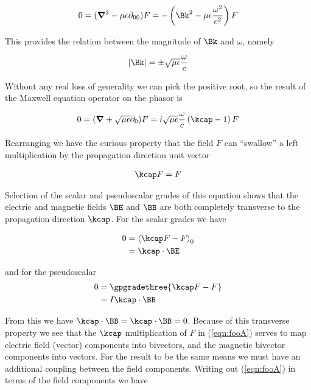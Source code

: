 \begin{align}\label{eqn:foo7}
0 = (\spacegrad^2 - {\mu\epsilon}\partial_{00}) F = -\left( \Bk^2 - {\mu\epsilon}\frac{\omega^2}{c^2} \right) F 
\end{align}

This provides the relation between the magnitude of $\Bk$ and $\omega$, namely

\begin{align}\label{eqn:foo8}
\Abs{\Bk} = \pm \sqrt{\mu\epsilon}\frac{\omega}{c} 
\end{align}

Without any real loss of generality we can pick the positive root, so the result of the Maxwell equation operator on the phasor is

\begin{align}\label{eqn:foo5}
0 = (\spacegrad + \sqrt{\mu\epsilon}\partial_0) F = i \sqrt{\mu\epsilon}\frac{\omega}{c} \left( \kcap - 1\right) F 
\end{align}

Rearranging we have the curious property that the field $F$ can ``swallow'' a left multiplication by the propagation direction unit vector 

\begin{align}\label{eqn:fooA}
\kcap F = F 
\end{align}

Selection of the scalar and pseudoscalar grades of this equation shows that the electric and magnetic fields $\BE$ and $\BB$ are both completely transverse to the propagation direction $\kcap$.  For the scalar grades we have

\begin{align*}
0 &= \gpgradezero{\kcap F - F} \\
  &= \kcap \cdot \BE
\end{align*}

and for the pseudoscalar
\begin{align*}
0 &= \gpgradethree{\kcap F - F} \\
  &= I \kcap \cdot \BB
\end{align*}

From this we have $\kcap \cdot \BB = \kcap \cdot \BB = 0$.  Because of this transverse property we see that the $\kcap$ multiplication of $F$ in (\ref{eqn:fooA}) serves to map electric field (vector) components into bivectors, and the magnetic bivector components into vectors.  For the result to be the same means we must have an additional coupling between the field components.  Writing out (\ref{eqn:fooA}) in terms of the field components we have

